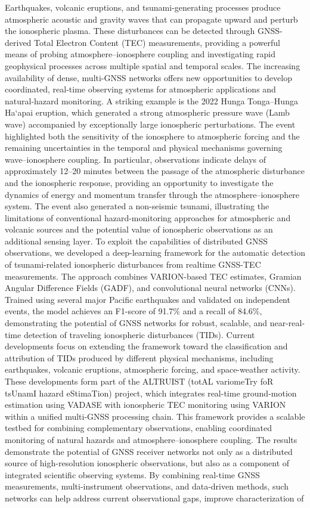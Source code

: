 \documentclass[11pt,a4paper]{article}
\newenvironment{EntryAbstract}[1][\normalsize]
  {\begingroup #1 \setlength{\parskip}{0.55em}\sloppy\noindent\ignorespaces}
  {\par\endgroup}
\begin{document}
\begin{EntryAbstract}[\small]
Earthquakes, volcanic eruptions, and tsunami-generating processes produce atmospheric acoustic and gravity waves that can propagate upward and perturb the ionospheric plasma. These disturbances can be detected through GNSS-derived Total Electron Content (TEC) measurements, providing a powerful means of probing atmosphere–ionosphere coupling and investigating rapid geophysical processes across multiple spatial and temporal scales. The increasing availability of dense, multi-GNSS networks offers new opportunities to develop coordinated, real-time observing systems for atmospheric applications and natural-hazard monitoring. A striking example is the 2022 Hunga Tonga–Hunga Ha‘apai eruption, which generated a strong atmospheric pressure wave (Lamb wave) accompanied by exceptionally large ionospheric perturbations. The event highlighted both the sensitivity of the ionosphere to atmospheric forcing and the remaining uncertainties in the temporal and physical mechanisms governing wave–ionosphere coupling. In particular, observations indicate delays of approximately 12–20 minutes between the passage of the atmospheric disturbance and the ionospheric response, providing an opportunity to investigate the dynamics of energy and momentum transfer through the atmosphere–ionosphere system. The event also generated a non-seismic tsunami, illustrating the limitations of conventional hazard-monitoring approaches for atmospheric and volcanic sources and the potential value of ionospheric observations as an additional sensing layer. To exploit the capabilities of distributed GNSS observations, we developed a deep-learning framework for the automatic detection of tsunami-related ionospheric disturbances from realtime GNSS-TEC measurements. The approach combines VARION-based TEC estimates, Gramian Angular Difference Fields (GADF), and convolutional neural networks (CNNs). Trained using several major Pacific earthquakes and validated on independent events, the model achieves an F1-score of 91.7\% and a recall of 84.6\%, demonstrating the potential of GNSS networks for robust, scalable, and near-real-time detection of traveling ionospheric disturbances (TIDs). Current developments focus on extending the framework toward the classification and attribution of TIDs produced by different physical mechanisms, including earthquakes, volcanic eruptions, atmospheric forcing, and space-weather activity. These developments form part of the ALTRUIST (totAL variomeTry foR tsUnamI hazard eStimaTion) project, which integrates real-time ground-motion estimation using VADASE with ionospheric TEC monitoring using VARION within a unified multi-GNSS processing chain. This framework provides a scalable testbed for combining complementary observations, enabling coordinated monitoring of natural hazards and atmosphere–ionosphere coupling. The results demonstrate the potential of GNSS receiver networks not only as a distributed source of high-resolution ionospheric observations, but also as a component of integrated scientific observing systems. By combining real-time GNSS measurements, multi-instrument observations, and data-driven methods, such networks can help address current observational gaps, improve characterization of 
\end{EntryAbstract}
\end{document}
